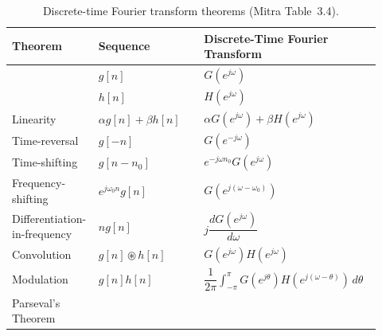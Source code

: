 \begin{table}[H]
\centering
\caption{Discrete-time Fourier transform theorems (Mitra Table~3.4).}
\label{tab:dtft-theorems}

\small
\begin{tabular}{@{}>{\raggedright\arraybackslash}p{0.17\linewidth}@{}>{\raggedright\arraybackslash}p{0.28\linewidth}@{}>{\raggedright\arraybackslash}p{0.47\linewidth}@{}}
\toprule
\textbf{Theorem} & \textbf{Sequence} & \textbf{Discrete-Time Fourier Transform} \\
\midrule
& $g[n]$ & $G(e^{j\omega})$ \\
& $h[n]$ & $H(e^{j\omega})$ \\
\midrule
Linearity &
$\alpha g[n]+\beta h[n]$ &
$\alpha G(e^{j\omega})+\beta H(e^{j\omega})$ \\[0.6em]
Time-reversal &
$g[-n]$ &
$G(e^{-j\omega})$ \\[0.6em]
Time-shifting &
$g[n-n_0]$ &
$e^{-j\omega n_0}G(e^{j\omega})$ \\[0.6em]
Frequency-shifting &
$e^{j\omega_0 n}g[n]$ &
$G\!\left(e^{j(\omega-\omega_0)}\right)$ \\[0.6em]
Differentiation-in-frequency &
$ng[n]$ &
$j\dfrac{dG(e^{j\omega})}{d\omega}$ \\[0.8em]
Convolution &
$g[n]\circledast h[n]$ &
$G(e^{j\omega})H(e^{j\omega})$ \\[0.6em]
Modulation &
$g[n]h[n]$ &
$\dfrac{1}{2\pi}\displaystyle\int_{-\pi}^{\pi}G(e^{j\theta})H(e^{j(\omega-\theta)})\,d\theta$ \\[0.8em]
Parseval's Theorem &
\multicolumn{2}{@{}l@{}}{%
$\displaystyle\sum_{n=-\infty}^{\infty}g[n]h^*[n]
=\dfrac{1}{2\pi}\displaystyle\int_{-\pi}^{\pi}G(e^{j\omega})H^*(e^{j\omega})\,d\omega$}%
\\
\bottomrule
\end{tabular}
\end{table}
